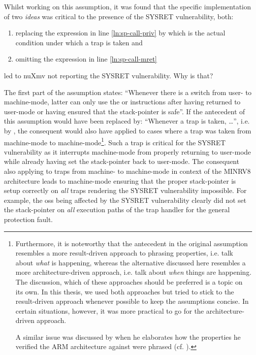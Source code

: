Whilst working on this assumption, it was found that the specific implementation of two \textit{ideas} was critical to the presence of the SYSRET vulnerability, both:
\begin{enumerate}
    \item \label{itm:no-sysret-priv}
    replacing the expression  in line \ref{ln:sp-call-priv} by  which is the actual condition under which a trap is taken and
    \item \label{itm:no-sysret-mret}
    omitting the expression  in line \ref{ln:sp-call-mret}
\end{enumerate}
led to nuXmv not reporting the SYSRET vulnerability.
Why is that?

The first part of the  assumption states: \enquote{Whenever there is a switch from user- to machine-mode, latter can only use the  or  instructions after having returned to user-mode or having ensured that the stack-pointer is safe}.
If the antecedent of this assumption would have been replaced by: \enquote{Whenever a trap is taken, \dots}, i.e. by , the consequent would also have applied to cases where a trap was taken from machine-mode to machine-mode\footnote{
    Furthermore, it is noteworthy that the antecedent in the original assumption resembles a more result-driven approach to phrasing properties, i.e. talk about \textit{what} is happening, whereas the alternative discussed here resembles a more architecture-driven approach, i.e. talk about \textit{when} things are happening.
    The discussion, which of these approaches should be preferred is a topic on its own.
    In this thesis, we used both approaches but tried to stick to the result-driven approach whenever possible to keep the assumptions concise.
    In certain situations, however, it was more practical to go for the architecture-driven approach.

    A similar issue was discussed by \citeauthor{Reid17} when he elaborates how the properties he verified the ARM architecture against were phrased (cf. \cite[p.88:4]{Reid17}).
}.
Such a trap is critical for the SYSRET vulnerability as it interrupts machine-mode from properly returning to user-mode while already having set the stack-pointer back to user-mode.
The consequent also applying to traps from machine- to machine-mode in context of the MINRV8 architecture leads to machine-mode ensuring that the proper stack-pointer is setup correctly on \textit{all} traps rendering the SYSRET vulnerability impossible.
For example, the \glspl{os} being affected by the SYSRET vulnerability clearly did not set the stack-pointer on \textit{all} execution paths of the trap handler for the general protection fault.

